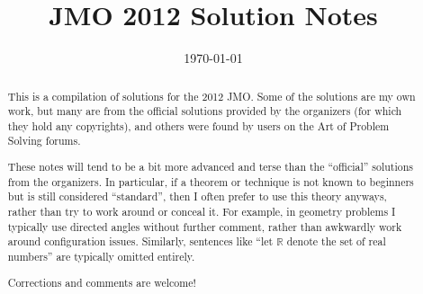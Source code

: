 \documentclass[11pt]{scrartcl}
\title{JMO 2012 Solution Notes}
\date{\today}
\begin{document}
\maketitle

\begin{abstract}
This is a compilation of solutions
for the 2012 JMO.
Some of the solutions are my own work,
but many are from the official solutions provided by the organizers
(for which they hold any copyrights),
and others were found by users on the Art of Problem Solving forums.

These notes will tend to be a bit more advanced and terse than the ``official''
solutions from the organizers.
In particular, if a theorem or technique is not known to beginners
but is still considered ``standard'', then I often prefer to
use this theory anyways, rather than try to work around or conceal it.
For example, in geometry problems I typically use directed angles
without further comment, rather than awkwardly work around configuration issues.
Similarly, sentences like ``let $\mathbb{R}$ denote the set of real numbers''
are typically omitted entirely.

Corrections and comments are welcome!
\end{abstract}

\tableofcontents
\newpage

\addtocounter{section}{-1}
\end{document}
